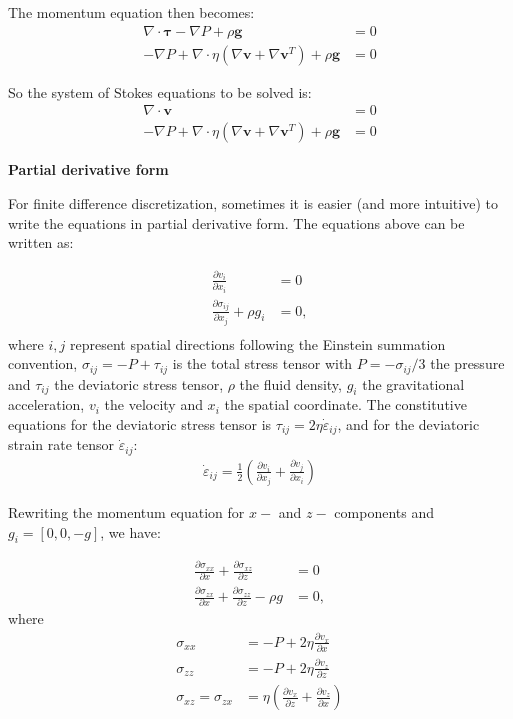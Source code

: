 \documentclass[a4paper,11pt]{article}
\begin{document}
The momentum equation then becomes:
\begin{align}
\nabla \cdot \bm{\tau}  -  \nabla P +\rho \textbf{g} &= 0 \\
-\nabla P + \nabla \cdot \eta\left(\nabla \textbf{v}+\nabla\textbf{v}^T\right)+\rho \textbf{g} &= 0
\end{align}

So the system of Stokes equations to be solved is:
\begin{align}
\nabla \cdot \textbf{v} &= 0 \label{eq:vecmass}\\
-\nabla P + \nabla \cdot \eta\left(\nabla \textbf{v}+\nabla\textbf{v}^T\right)+\rho \textbf{g} &= 0 \label{eq:vecmomm}
\end{align}

\textbf{Partial derivative form}

For finite difference discretization, sometimes it is easier (and more intuitive) to write the equations in partial derivative form. The equations above can be written as:

\begin{eqnarray}
\frac{\displaystyle \partial v_{i}}{\displaystyle \partial x_i} &= 0 \\
\frac{\displaystyle \partial \sigma_{ij}}{\displaystyle \partial x_j} + \rho g_i &= 0,\\
\end{eqnarray}
where $i,j$ represent spatial directions following the Einstein summation convention, $\sigma_{ij} = -P + \tau_{ij}$ is the total stress tensor with $P = -\sigma_{ij}/3$ the pressure and $\tau_{ij}$ the deviatoric stress tensor, $\rho$ the fluid density, $g_i$ the gravitational acceleration, $v_i$ the velocity and $x_i$ the spatial coordinate. The constitutive equations for the deviatoric stress tensor is $\tau_{ij} = 2\eta\dot{\varepsilon}_{ij}$, and for the deviatoric strain rate tensor $\dot{\varepsilon}_{ij}$:
\begin{align}
\dot{\varepsilon}_{ij} = \frac{1}{2}\left(\frac{\partial v_i}{\partial x_j}+\frac{\partial v_j}{\partial x_i}\right)
\end{align}

Rewriting the momentum equation for $x-$ and $z-$ components and $g_i = [0,0,-g]$, we have:

\begin{align}
\frac{\displaystyle \partial \sigma_{xx}}{\displaystyle \partial x}+\frac{\displaystyle \partial \sigma_{xz}}{\displaystyle \partial z} &= 0 \\
\frac{\displaystyle \partial \sigma_{zx}}{\displaystyle \partial x}+\frac{\displaystyle \partial \sigma_{zz}}{\displaystyle \partial z}-\rho g &= 0,
\end{align}
where 
\begin{align}
\sigma_{xx} &= -P + 2\eta\frac{\displaystyle \partial v_x}{\displaystyle \partial x}\\ 
\sigma_{zz} &= -P + 2\eta\frac{\displaystyle \partial v_z}{\displaystyle \partial z} \\
\sigma_{xz} = \sigma_{zx} &= \eta\left(\frac{\displaystyle \partial v_x}{\displaystyle \partial z}+\frac{\displaystyle \partial v_z}{\displaystyle \partial x}\right) 
\end{align}
\end{document}
